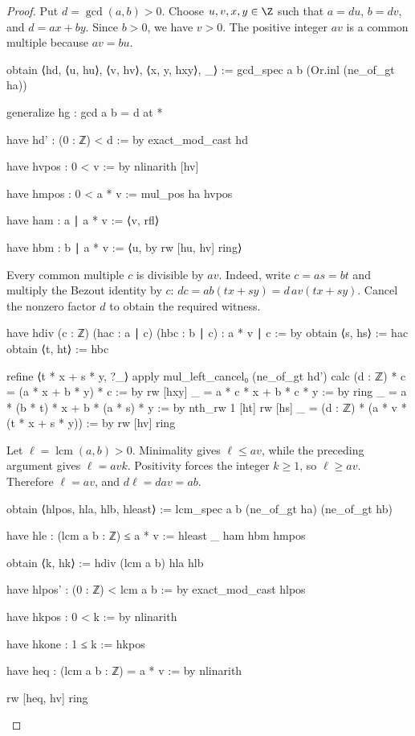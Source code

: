 \begin{proof}

  Put $d=\gcd(a,b)>0$. Choose $u,v,x,y\in\Z$ such that $a=du$, $b=dv$, and $d=ax+by$. Since $b>0$, we have $v>0$. The positive integer $av$ is a common multiple because $av=bu$.

  \begin{lean}
    obtain ⟨hd, ⟨u, hu⟩, ⟨v, hv⟩, ⟨x, y, hxy⟩, _⟩ :=
      gcd_spec a b (Or.inl (ne_of_gt ha))

    generalize hg : gcd a b = d at *

    have hd' : (0 : ℤ) < d := by
      exact_mod_cast hd

    have hvpos : 0 < v := by
      nlinarith [hv]

    have hmpos : 0 < a * v := mul_pos ha hvpos

    have ham : a ∣ a * v := ⟨v, rfl⟩

    have hbm : b ∣ a * v := ⟨u, by
      rw [hu, hv]
      ring⟩
  \end{lean}

  Every common multiple $c$ is divisible by $av$. Indeed, write $c=as=bt$ and multiply the Bezout identity by $c$: $dc=ab(tx+sy)=d\,av(tx+sy)$. Cancel the nonzero factor $d$ to obtain the required witness.

  \begin{lean}
    have hdiv (c : ℤ) (hac : a ∣ c) (hbc : b ∣ c) : a * v ∣ c := by
      obtain ⟨s, hs⟩ := hac
      obtain ⟨t, ht⟩ := hbc

      refine ⟨t * x + s * y, ?_⟩
      apply mul_left_cancel₀ (ne_of_gt hd')
      calc
        (d : ℤ) * c = (a * x + b * y) * c := by
          rw [hxy]
        _ = a * c * x + b * c * y := by
          ring
        _ = a * (b * t) * x + b * (a * s) * y := by
          nth_rw 1 [ht]
          rw [hs]
        _ = (d : ℤ) * (a * v * (t * x + s * y)) := by
          rw [hv]
          ring
  \end{lean}

  Let $\ell=\operatorname{lcm}(a,b)>0$. Minimality gives $\ell\le av$, while the preceding argument gives $\ell=avk$. Positivity forces the integer $k\ge1$, so $\ell\ge av$. Therefore $\ell=av$, and $d\ell=dav=ab$.

  \begin{lean}
    obtain ⟨hlpos, hla, hlb, hleast⟩ := lcm_spec a b (ne_of_gt ha) (ne_of_gt hb)

    have hle : (lcm a b : ℤ) ≤ a * v := hleast _ ham hbm hmpos

    obtain ⟨k, hk⟩ := hdiv (lcm a b) hla hlb

    have hlpos' : (0 : ℤ) < lcm a b := by
      exact_mod_cast hlpos

    have hkpos : 0 < k := by
      nlinarith

    have hkone : 1 ≤ k := hkpos

    have heq : (lcm a b : ℤ) = a * v := by
      nlinarith

    rw [heq, hv]
    ring
  \end{lean}

\end{proof}

